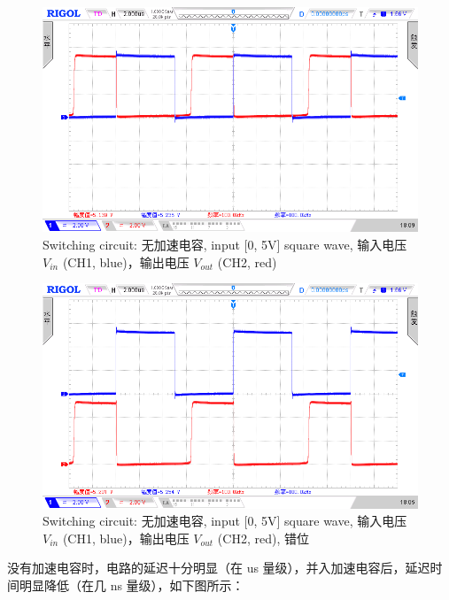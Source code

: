 \documentclass[UTF8]{article}
\begin{document}
\begin{figure}[H]\centering
    \includegraphics[width=\columnwidth]{LCE-02-三极管/assets/开关电路 无加速电容, input 100 kHz.png}
    \caption{Switching circuit: 无加速电容, input [0, 5V] square wave, 输入电压 $V_{in}$ (CH1, blue)，输出电压 $V_{out}$ (CH2, red)}
    \label{fig: Switching circuit}
\end{figure}

\begin{figure}[H]\centering
    \includegraphics[width=\columnwidth]{LCE-02-三极管/assets/开关电路 无加速电容 (错位), input 100 kHz.png}
    \caption{Switching circuit: 无加速电容,  input [0, 5V] square wave, 输入电压 $V_{in}$ (CH1, blue)，输出电压 $V_{out}$ (CH2, red), 错位}
\end{figure}

没有加速电容时，电路的延迟十分明显（在 us 量级），并入加速电容后，延迟时间明显降低（在几 ns 量级），如下图所示：
\end{document}
